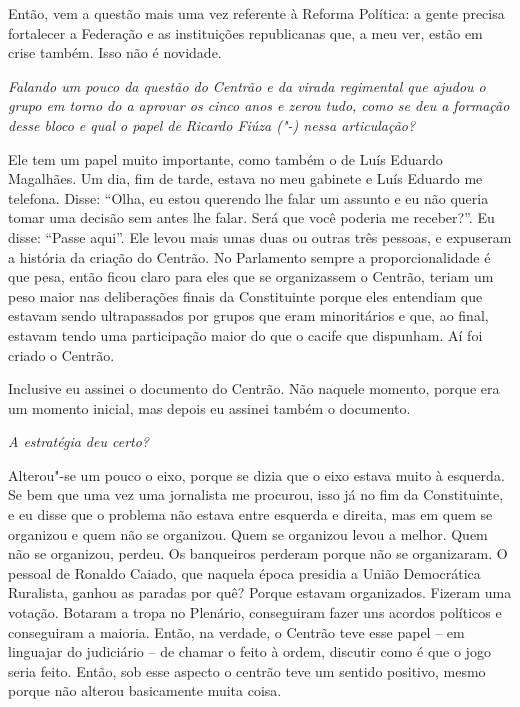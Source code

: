 Então, vem a questão mais uma vez referente à Reforma Política: a gente
precisa fortalecer a Federação e as instituições republicanas que, a meu
ver, estão em crise também. Isso não é novidade.

\medskip

\emph{Falando um pouco da questão do Centrão e da virada regimental
que ajudou o grupo em torno do  a aprovar os cinco anos e zerou tudo,
como se deu a formação desse bloco e qual o papel de Ricardo Fiúza
("-) nessa articulação? }

Ele tem um papel muito importante, como também o de
Luís Eduardo Magalhães. Um dia, fim de tarde, estava no meu gabinete e
Luís Eduardo me telefona. Disse: ``Olha, eu estou querendo lhe falar um
assunto e eu não queria tomar uma decisão sem antes lhe falar. Será que
você poderia me receber?''. Eu disse: ``Passe aqui''. Ele levou mais
umas duas ou outras três pessoas, e expuseram a história da criação do
Centrão. No Parlamento sempre a proporcionalidade é que pesa, então
ficou claro para eles que se organizassem o Centrão, teriam um peso
maior nas deliberações finais da Constituinte porque eles entendiam que
estavam sendo ultrapassados por grupos que eram minoritários e que, ao
final, estavam tendo uma participação maior do que o cacife que
dispunham. Aí foi criado o Centrão.

Inclusive eu assinei o documento do Centrão. Não naquele momento, porque
era um momento inicial, mas depois eu assinei também o documento.

\medskip

\emph{A estratégia deu certo?}

Alterou"-se um pouco o eixo, porque se dizia que o eixo
estava muito à esquerda. Se bem que uma vez uma jornalista me procurou,
isso já no fim da Constituinte, e eu disse que o problema não estava
entre esquerda e direita, mas em quem se organizou e quem não se
organizou. Quem se organizou levou a melhor. Quem não se organizou,
perdeu. Os banqueiros perderam porque não se organizaram. O pessoal de
Ronaldo Caiado, que naquela época presidia a União Democrática
Ruralista, ganhou as paradas por quê? Porque estavam organizados.
Fizeram uma votação. Botaram a tropa no Plenário, conseguiram fazer uns
acordos políticos e conseguiram a maioria. Então, na verdade, o Centrão
teve esse papel -- em linguajar do judiciário -- de chamar o feito à
ordem, discutir como é que o jogo seria feito. Então, sob esse aspecto o
centrão teve um sentido positivo, mesmo porque não alterou basicamente
muita coisa.

